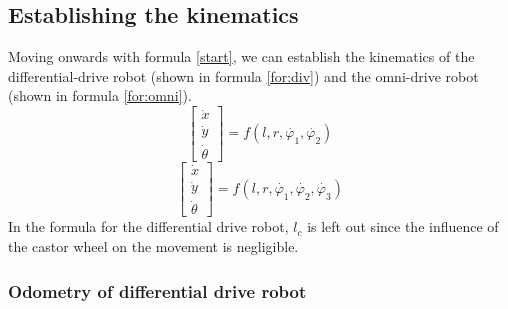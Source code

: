 \documentclass[12pt]{article}
\begin{document}
\subsection{Establishing the kinematics}
Moving onwards with formula \ref{start}, we can establish the kinematics of the differential-drive robot (shown in formula \ref{for:div}) and the omni-drive robot (shown in formula \ref{for:omni}).
\begin{equation}
    \begin{bmatrix} 
        \dot{x} \\ 
        \dot{y} \\ 
        \dot{\theta}
    \end{bmatrix} 
    = f(l, r, \dot{\varphi_1}, \dot{\varphi_2})
    \label{for:div}
\end{equation} 
\begin{equation}
    \begin{bmatrix} 
        \dot{x} \\ 
        \dot{y} \\ 
        \dot{\theta}
    \end{bmatrix} 
    = f(l, r, \dot{\varphi_1}, \dot{\varphi_2}, \dot{\varphi_3})
    \label{for:omni}
\end{equation} 
In the formula for the differential drive robot, $l_c$ is left out since the influence of the castor wheel on the movement is negligible.
\subsubsection{Odometry of differential drive robot}
\end{document}
